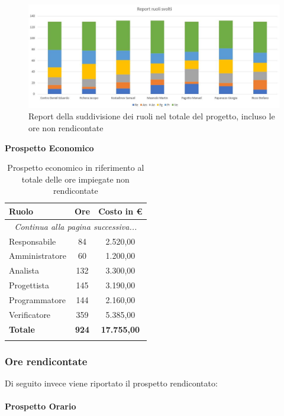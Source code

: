 \documentclass[../piano_di_progetto.tex]{subfiles}
\begin{document}
\begin{figure}[H]
\centering
\includegraphics[width=12cm]{src/img/report/report_ruoli_tot}
\caption{Report della suddivisione dei ruoli nel totale del progetto, incluso le ore non rendicontate}
\end{figure}

\clearpage

\textbf{Prospetto Economico}

\begin{center}
	\begin{longtable}{|l|c|c|}
		\hline
		\rowcolor{lightgray}
		\textbf{Ruolo} & \textbf{Ore} & \textbf{Costo in €}\\
		\hline
		\endhead
		
		\hline
		\multicolumn{3}{|c|}{\emph{Continua alla pagina successiva...}}\\
		\hline
		\endfoot

		\endlastfoot
		
		Responsabile &  84  & 2.520,00\\
		Amministratore &  60  & 1.200,00\\
		Analista &  132  & 3.300,00 \\
		Progettista  & 145 & 3.190,00\\
		Programmatore  & 144 & 2.160,00\\
		Verificatore  & 359 & 5.385,00\\
		\hline
		\textbf{Totale} & \textbf{924} & \textbf{17.755,00}\\
		\hline
		\rowcolor{white}
		\caption{Prospetto economico in riferimento al totale delle ore impiegate non rendicontate}
	\end{longtable}
\end{center}

\subsubsection{Ore rendicontate}
Di seguito invece viene riportato il prospetto rendicontato:\\ \\
\textbf{Prospetto Orario}
\end{document}

